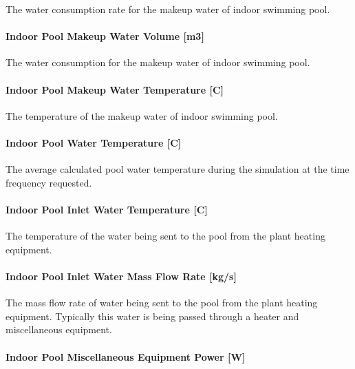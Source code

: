 The water consumption rate for the makeup water of indoor swimming pool.

\paragraph{Indoor Pool Makeup Water Volume {[}m3{]}}\label{indoor-pool-makeup-water-volume-m3}

The water consumption for the makeup water of indoor swimming pool.

\paragraph{Indoor Pool Makeup Water Temperature {[}C{]}}\label{indoor-pool-makeup-water-temperature-c}

The temperature of the makeup water of indoor swimming pool.

\paragraph{Indoor Pool Water Temperature {[}C{]}}\label{indoor-pool-water-temperature-c}

The average calculated pool water temperature during the simulation at the time frequency requested.

\paragraph{Indoor Pool Inlet Water Temperature {[}C{]}}\label{indoor-pool-inlet-water-temperature-c}

The temperature of the water being sent to the pool from the plant heating equipment.

\paragraph{Indoor Pool Inlet Water Mass Flow Rate {[}kg/s{]}}\label{indoor-pool-inlet-water-mass-flow-rate-kgs}

The mass flow rate of water being sent to the pool from the plant heating equipment. Typically this water is being passed through a heater and miscellaneous equipment.

\paragraph{Indoor Pool Miscellaneous Equipment Power {[}W{]}}\label{indoor-pool-miscellaneous-equipment-power-w}


